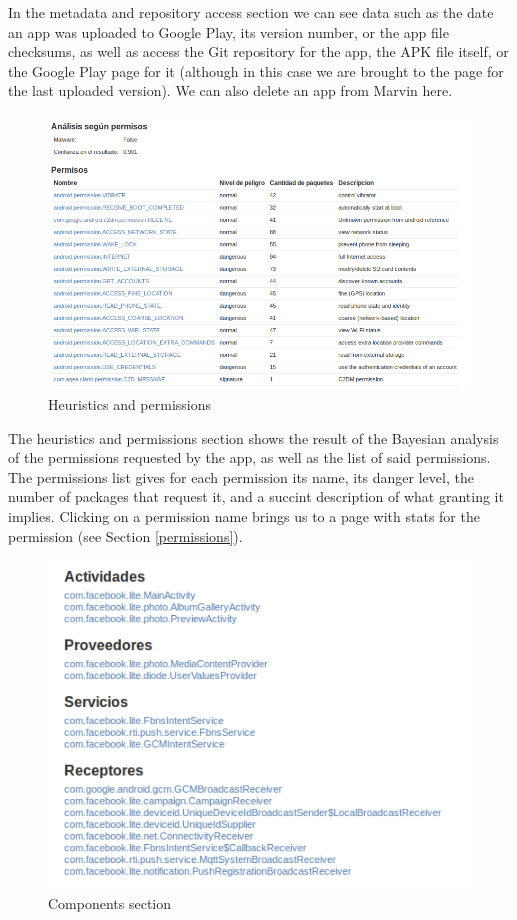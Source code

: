 \documentclass[11pt]{article}
\begin{document}
In the metadata and repository access section we can see data such as the date an app was uploaded to Google Play, its version number, or the app file checksums, as well as access the Git repository for the app, the APK file itself, or the Google Play page for it (although in this case we are brought to the page for the last uploaded version). We can also delete an app from Marvin here.

\begin{figure}[H]
\begin{center}
\includegraphics[width=\textwidth]{graphics/marvin_app2.png}
\caption{Heuristics and permissions}
\end{center}
\end{figure}

The heuristics and permissions section shows the result of the Bayesian analysis of the permissions requested by the app, as well as the list of said permissions. The permissions list gives for each permission its name, its danger level, the number of packages that request it, and a succint description of what granting it implies. Clicking on a permission name brings us to a page with stats for the permission (see Section \ref{permissions}).
\begin{figure}[H]
\begin{center}
\includegraphics[width=.8\textwidth]{graphics/marvin_app3.png}
\caption{Components section}
\end{center}
\end{figure}
\end{document}
